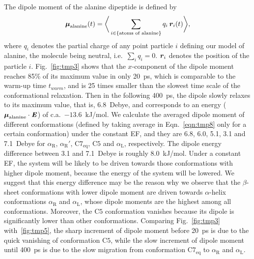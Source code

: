 \documentclass[a4paper,preprint,unsortedaddress,onecolumn]{revtex4-1}
\newcommand{\vect}[1]{\textbf{\textit{#1}}}
\newcommand{\confaa}[0]{{\alpha_{\textrm{R}}}}
\newcommand{\confab}[0]{{\alpha_{\textrm{R}}'}}
\newcommand{\confba}[0]{{\textrm{C}7_{\textrm{eq}}}}
\newcommand{\confbb}[0]{{\textrm{C}5}}
\newcommand{\confc}[0]{{\alpha_{\textrm{L}}}}
\begin{document}
The dipole moment of the alanine dipeptide is defined by
\begin{align}\label{eqn:tmp8}
  \boldsymbol\mu_{\textrm{alanine}}(t) =
  \bigg\langle
  \sum_{i\in \{\textrm{atoms of alanine}\}}
  q_i\, \vect r_i(t)
  \bigg\rangle,
\end{align}
where $q_i$ denotes the partial charge of any point particle $i$ defining our model of alanine,
the molecule being neutral, i.e.~$\sum_iq_i = 0$.
$\vect r_i$ denotes the position of the particle $i$.
Fig.~\ref{fig:tmp3}
shows that the $x$-component of the dipole moment 
reaches 85\% of its maximum value in only 20~ps, which is comparable to
the warm-up time $t_{warm}$, and is 25 times
smaller than the slowest time scale of the conformational relaxation.
Then in the following 400~ps, the dipole slowly relaxes to its 
maximum value, that is, 
6.8~Debye, and  corresponds to an energy
($\boldsymbol\mu_{\textrm{alanine}} \cdot \vect E$)
of c.a.~$-13.6$~kJ/mol.
We calculate the averaged dipole moment of different conformations
(defined by taking average in Eqn.~\eqref{eqn:tmp8}
only for a certain conformation)
under the constant EF, and they are 6.8, 6.0, 5.1, 3.1 and 7.1~Debye
for $\confaa$, $\confab$, $\confba$, $\confbb$ and $\confc$, respectively.
The dipole energy difference between 3.1 and 7.1~Debye is roughly 8.0~kJ/mol.
Under a constant EF, the system will be likely to be driven towards those
conformations with higher dipole moment, because the
energy of the system will be lowered.  We suggest that this energy difference may be the reason why
we observe that the $\beta$-sheet conformations with lower dipole moment
are driven towards $\alpha$-helix conformations
$\confaa$ and $\confc$, whose dipole moments are the highest
among all conformations. Moreover, the $\confbb$ conformation vanishes because
its dipole is significantly lower than other conformations.
Comparing Fig.~\ref{fig:tmp3} with~\ref{fig:tmp5},
  the sharp increment of dipole moment before 20~ps is due to the quick vanishing of conformation
  $\confbb$, while the slow increment of dipole moment until 400~ps is due to
  the slow migration from conformation $\confba$ to $\confaa$ and $\confc$.
\end{document}
